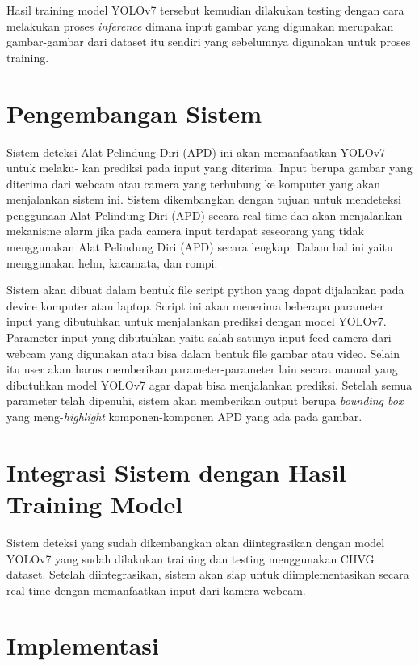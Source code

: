 \par Hasil training model YOLOv7 tersebut kemudian dilakukan testing dengan cara melakukan proses \textit{inference} dimana input gambar yang digunakan merupakan gambar-gambar dari dataset itu sendiri yang sebelumnya digunakan untuk proses training.

\section{Pengembangan Sistem}
\label{sec:pengembangansistem}

Sistem deteksi Alat Pelindung Diri (APD) ini akan memanfaatkan YOLOv7 untuk melaku- kan prediksi pada input yang diterima. Input berupa gambar yang diterima dari
webcam atau camera yang terhubung ke komputer yang akan menjalankan sistem ini.
Sistem dikembangkan dengan tujuan untuk mendeteksi penggunaan Alat Pelindung Diri (APD) secara real-time dan akan menjalankan mekanisme alarm jika pada camera input
terdapat seseorang yang tidak menggunakan Alat Pelindung Diri (APD) secara lengkap. Dalam hal ini yaitu menggunakan helm, kacamata, dan rompi.

Sistem akan dibuat dalam bentuk file script python yang dapat dijalankan pada device komputer atau laptop. Script ini akan menerima beberapa parameter input yang dibutuhkan untuk menjalankan prediksi dengan model YOLOv7. Parameter input yang dibutuhkan yaitu salah satunya input feed camera dari webcam yang digunakan atau bisa dalam bentuk file gambar atau video.
Selain itu user akan harus memberikan parameter-parameter lain secara manual yang dibutuhkan model YOLOv7 agar dapat bisa menjalankan prediksi. Setelah semua parameter telah dipenuhi, sistem akan memberikan output berupa \textit{bounding box} yang meng-\textit{highlight} komponen-komponen APD yang ada pada gambar.

\section{Integrasi Sistem dengan Hasil Training Model}
\label{subsec:integrasi}

Sistem deteksi yang sudah dikembangkan akan diintegrasikan dengan model YOLOv7 yang sudah dilakukan training dan testing menggunakan CHVG dataset. Setelah diintegrasikan, sistem akan siap untuk diimplementasikan secara real-time dengan memanfaatkan input dari kamera webcam.

\section{Implementasi}
\label{subsec:implementasi}

